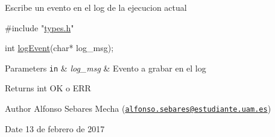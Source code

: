 Escribe un evento en el log de la ejecucion actual


\begin{DoxyCode}
\textcolor{preprocessor}{#include "\hyperlink{types_8h}{types.h}"}

\textcolor{keywordtype}{int} \hyperlink{logger_8h_af71188329ee1cf68a59d3f9ddd035ca6}{logEvent}(\textcolor{keywordtype}{char}* log\_msg);
\end{DoxyCode}



\begin{DoxyParams}[1]{Parameters}
\mbox{\tt in}  & {\em log\-\_\-msg} & Evento a grabar en el log\\
\hline
\end{DoxyParams}
\begin{DoxyReturn}{Returns}
int O\-K o E\-R\-R 
\end{DoxyReturn}
\begin{DoxyAuthor}{Author}
Alfonso Sebares Mecha (\href{mailto:alfonso.sebares@estudiante.uam.es}{\tt alfonso.\-sebares@estudiante.\-uam.\-es})
\end{DoxyAuthor}
\begin{DoxyDate}{Date}
13 de febrero de 2017
\end{DoxyDate}


 